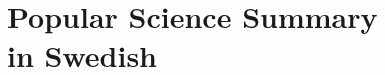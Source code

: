 \documentclass[11pt, twoside, openright]{book}
\theoremstyle{definition}
\newcommand{\paperref}[1]{Paper~\ref{#1}}
\newif\ifpopvetOnly
\newif\ifcontributionStatementOnly
\newif\ifpaperIV %
\newcommand{\paperIVtitle}{A Digital Twin Based Industrial Automation and Control System Security Architecture}
\begin{document}
\ifpaperIV
\newrefsegment
\addtolength{\apa}{2cm}
\fancyhead[RE]{\truncate{.95\headwidth}{\paperref{ch:digital-twin}: \paperIVtitle}}

\fi

\part[Popular Science Summary in Swedish]{\texorpdfstring{%
Popular Science Summary\\in Swedish}{%
Popular Science Summary in Swedish}}

\fi

\fi

\makeatletter
\def\@makeschapterhead#1{%
  \vspace*{10\p@}%
  {\parindent \z@ \raggedleft \reset@font
            \sffamily \bfseries \vphantom{\@chapapp{} \thechapter}
        \par\nobreak
        \interlinepenalty\@M
    \Huge  #1\par\nobreak
    \hrulefill
    \par\nobreak
    \vskip 16\p@
  }}
\makeatother


\end{document}
